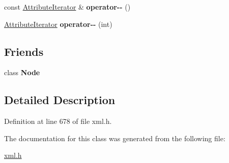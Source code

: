 \begin{DoxyCompactItemize}
\item 
\hypertarget{classphys_1_1xml_1_1AttributeIterator_a0fab0cb1b2d3c779ab5c7215a11fc543}{
const \hyperlink{classphys_1_1xml_1_1AttributeIterator}{AttributeIterator} \& {\bfseries operator-\/-\/} ()}
\label{de/d78/classphys_1_1xml_1_1AttributeIterator_a0fab0cb1b2d3c779ab5c7215a11fc543}

\item 
\hypertarget{classphys_1_1xml_1_1AttributeIterator_ae46ebed7b404ae085c47984f615a7597}{
\hyperlink{classphys_1_1xml_1_1AttributeIterator}{AttributeIterator} {\bfseries operator-\/-\/} (int)}
\label{de/d78/classphys_1_1xml_1_1AttributeIterator_ae46ebed7b404ae085c47984f615a7597}

\end{DoxyCompactItemize}
\subsection*{Friends}
\begin{DoxyCompactItemize}
\item 
\hypertarget{classphys_1_1xml_1_1AttributeIterator_a6db9d28bd448a131448276ee03de1e6d}{
class {\bfseries Node}}
\label{de/d78/classphys_1_1xml_1_1AttributeIterator_a6db9d28bd448a131448276ee03de1e6d}

\end{DoxyCompactItemize}


\subsection{Detailed Description}


Definition at line 678 of file xml.h.



The documentation for this class was generated from the following file:\begin{DoxyCompactItemize}
\item 
\hyperlink{xml_8h}{xml.h}\end{DoxyCompactItemize}
